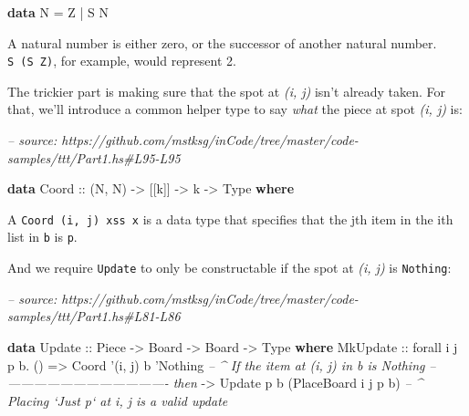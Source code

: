 \documentclass[]{article}
\newenvironment{Shaded}{}{}
\newcommand{\CommentTok}[1]{\textcolor[rgb]{0.38,0.63,0.69}{\textit{#1}}}
\newcommand{\DataTypeTok}[1]{\textcolor[rgb]{0.56,0.13,0.00}{#1}}
\newcommand{\FunctionTok}[1]{\textcolor[rgb]{0.02,0.16,0.49}{#1}}
\newcommand{\KeywordTok}[1]{\textcolor[rgb]{0.00,0.44,0.13}{\textbf{#1}}}
\newcommand{\NormalTok}[1]{#1}
\newcommand{\OtherTok}[1]{\textcolor[rgb]{0.00,0.44,0.13}{#1}}
\begin{document}
\begin{Shaded}
\begin{Highlighting}[]
\KeywordTok{data} \DataTypeTok{N} \FunctionTok{=} \DataTypeTok{Z} \FunctionTok{|} \DataTypeTok{S} \DataTypeTok{N}
\end{Highlighting}
\end{Shaded}

A natural number is either zero, or the successor of another natural number.
\texttt{S\ (S\ Z)}, for example, would represent 2.

The trickier part is making sure that the spot at \emph{(i, j)} isn't already
taken. For that, we'll introduce a common helper type to say \emph{what} the
piece at spot \emph{(i, j)} is:

\begin{Shaded}
\begin{Highlighting}[]
\CommentTok{-- source: https://github.com/mstksg/inCode/tree/master/code-samples/ttt/Part1.hs#L95-L95}

\KeywordTok{data} \DataTypeTok{Coord}\OtherTok{ ::}\NormalTok{ (}\DataTypeTok{N}\NormalTok{, }\DataTypeTok{N}\NormalTok{) }\OtherTok{->}\NormalTok{ [[k]] }\OtherTok{->}\NormalTok{ k }\OtherTok{->} \DataTypeTok{Type} \KeywordTok{where}
\end{Highlighting}
\end{Shaded}

A \texttt{Coord\ \textquotesingle{}(i,\ j)\ xss\ x} is a data type that
specifies that the jth item in the ith list in \texttt{b} is \texttt{p}.

And we require \texttt{Update} to only be constructable if the spot at \emph{(i,
j)} is \texttt{Nothing}:

\begin{Shaded}
\begin{Highlighting}[]
\CommentTok{-- source: https://github.com/mstksg/inCode/tree/master/code-samples/ttt/Part1.hs#L81-L86}

\KeywordTok{data} \DataTypeTok{Update}\OtherTok{ ::} \DataTypeTok{Piece} \OtherTok{->} \DataTypeTok{Board} \OtherTok{->} \DataTypeTok{Board} \OtherTok{->} \DataTypeTok{Type} \KeywordTok{where}
    \DataTypeTok{MkUpdate}
\OtherTok{        ::}\NormalTok{ forall i j p b}\FunctionTok{.}\NormalTok{ ()}
        \OtherTok{=>} \DataTypeTok{Coord}\NormalTok{ '(i, j) b '}\DataTypeTok{Nothing}         \CommentTok{-- ^ If the item at (i, j) in b is Nothing}
        \CommentTok{-- ------------------------------------- then}
        \OtherTok{->} \DataTypeTok{Update}\NormalTok{ p b (}\DataTypeTok{PlaceBoard}\NormalTok{ i j p b)  }\CommentTok{-- ^ Placing `Just p` at i, j is a valid update}
\end{Highlighting}
\end{Shaded}
\end{document}
